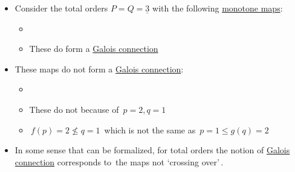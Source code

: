 
\begin{itemize}
    \item Consider the total orders $P = Q = \underline{3}$ with the following \href{doc/1 math/Seven Sketches in Compositionality/Chapter 1: Generative Effects/4 Monotone maps/1 Monotone map}{monotone maps}:
          \begin{itemize}
            \item {}
            \item These do form a \href{doc/1 math/Seven Sketches in Compositionality/Chapter 1: Generative Effects/6 Galois connections/1 Definition and examples/Galois connection}{Galois connection}    \end{itemize}
    \item These maps do not form a \href{doc/1 math/Seven Sketches in Compositionality/Chapter 1: Generative Effects/4 Monotone maps/1 Monotone map}{Galois connection}:
          \begin{itemize}
            \item {}
            \item These do not because of \,$p=2, q = 1$\,
            \item \,$f(p)=2 \not \leq q=1$\, which is not the same as \,$p = 1 \leq g(q)=2$\,    \end{itemize}
    \item In some sense that can be formalized, for total orders the notion of \href{doc/1 math/Seven Sketches in Compositionality/Chapter 1: Generative Effects/6 Galois connections/1 Definition and examples/Galois connection}{Galois connection} corresponds to \,the maps not `crossing over'\,.    \end{itemize}